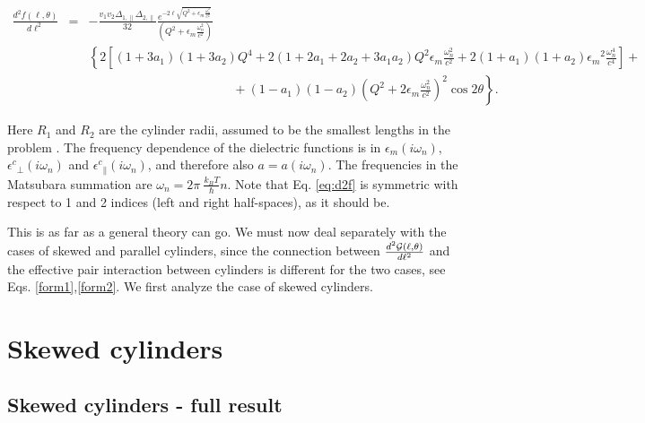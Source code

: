 \documentclass[onecolumn,letterpaper,amsmath,amssymb,floatfix,aps,superscriptaddress]{revtex4}
\begin{document}
\begin{widetext}
\begin{eqnarray}
\frac{d^{2}f(\ell,\theta)}{d\ell^{2}} &=& - \frac{v_1 v_2 \Delta_{1,\parallel} \Delta_{2,\parallel}}{32} 
\frac{e^{-2 \ell \sqrt{Q^{2} + \epsilon_m \frac{\omega_n^{2}}{c^{2}}}}}{(Q^{2} + \epsilon_m \frac{\omega_n^{2}}{c^{2}})} \nonumber \\
& &
\left\{ 2 \left[ (1+3a_1)(1+3a_2) Q^{4} + 2 (1+2a_1+2a_2+3a_1a_2) Q^{2} \epsilon_m \frac{\omega_n^{2}}{c^{2}} + 2(1+a_1)(1+a_2) {\epsilon_m}^{2} \frac{\omega_n^{4}}{c^{4}}\right] \right. + \nonumber\\
& & \left. ~~~~~~~~~~~~~~~~~~~~~~~~~~~~~~~~~~~~~~~~~~~~~~~~~~~~ + (1-a_1)(1-a_2)\left( Q^{2} + 2 \epsilon_m \frac{\omega_n^{2}}{c^{2}} \right)^2 \cos 2\theta \right \}.
\label{eq:d2f}
\end{eqnarray}
\end{widetext}
Here $R_1$ and $R_2$ are the cylinder radii, assumed to be the smallest lengths in the problem \cite{Barash89}. The frequency dependence of the dielectric functions is in 
$\epsilon_m(i \omega_n)$, ${\epsilon^{c}}_{\perp}(i \omega_n)$ and ${\epsilon^{c}}_{\parallel}(i \omega_n)$, and therefore also $a = a(i \omega_n)$. The frequencies 
in the Matsubara summation are $\omega_n = 2\pi~\frac{k_BT}{\hbar} n$. Note that Eq. \ref{eq:d2f} is symmetric with respect to 1 and 2 indices (left and right 
half-spaces), as it should be.

This is as far as a general theory can go. We must now deal separately with the cases of skewed and parallel cylinders, since the connection 
between $\frac{d^{2}{\cal G}(\ell,\theta)}{d\ell^{2}}$ and the effective pair interaction between cylinders is different for the two cases, 
see Eqs. \ref{form1},\ref{form2}. We first analyze the case of skewed cylinders.

\section{Skewed cylinders}

\subsection{Skewed cylinders - full result}
\end{document}
